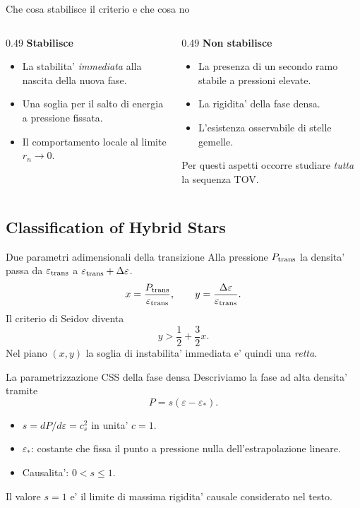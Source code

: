 \begin{frame}{Che cosa stabilisce il criterio e che cosa no}
\small
\begin{columns}[T,onlytextwidth]
\begin{column}{0.49\textwidth}
\textbf{Stabilisce}
\begin{itemize}
\item La stabilita' \emph{immediata} alla nascita della nuova fase.
\item Una soglia per il salto di energia a pressione fissata.
\item Il comportamento locale al limite $r_n\to0$.
\end{itemize}
\end{column}
\begin{column}{0.49\textwidth}
\textbf{Non stabilisce}
\begin{itemize}
\item La presenza di un secondo ramo stabile a pressioni elevate.
\item La rigidita' della fase densa.
\item L'esistenza osservabile di stelle gemelle.
\end{itemize}
\medskip
Per questi aspetti occorre studiare \emph{tutta} la sequenza TOV.
\end{column}
\end{columns}
\end{frame}

\subsection{Classification of Hybrid Stars}

\begin{frame}{Due parametri adimensionali della transizione}
\small
Alla pressione $P_{\rm trans}$ la densita' passa da
$\varepsilon_{\rm trans}$ a
$\varepsilon_{\rm trans}+\Delta\varepsilon$.
\[
x=\frac{P_{\rm trans}}{\varepsilon_{\rm trans}},
\qquad
y=\frac{\Delta\varepsilon}{\varepsilon_{\rm trans}}.
\]
Il criterio di Seidov diventa
\[
{y>\frac12+\frac32 x.}
\]
Nel piano $(x,y)$ la soglia di instabilita' immediata
 e' quindi una \emph{retta}.
\end{frame}

\begin{frame}{La parametrizzazione CSS della fase densa}
\small
Descriviamo la fase ad alta densita' tramite
\[
{P=s(\varepsilon-\varepsilon_*).}
\]
\begin{itemize}
\item $s=dP/d\varepsilon=c_s^2$ in unita' $c=1$.
\item $\varepsilon_*$: costante che fissa il punto a pressione nulla
  dell'estrapolazione lineare.
\item Causalita': $0<s\leq1$.
\end{itemize}
Il valore $s=1$ e' il limite di massima rigidita' causale
considerato nel testo.
\end{frame}


